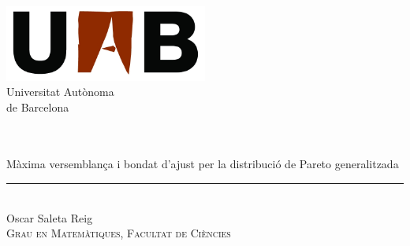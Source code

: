 
\begin{titlepage}

\begin{center}




\begin{minipage}[t]{0.4\textwidth}
\begin{center}
\includegraphics[width=0.5\textwidth]{figures/uab_logo.jpg}\\[0.15cm]
{\Large Universitat Autònoma \\de Barcelona}
\end{center}
\end{minipage}
\\[1.2cm]



\HRule\\[0.4cm]
{
\Huge Màxima versemblança i bondat d'ajust
per la distribució de Pareto generalitzada}\\[0.13cm]
\rule{\textwidth}{0.4pt}\vspace*{-\baselineskip}\vspace{3.2pt}
\HRule\\[0.7cm]
{\large Oscar Saleta Reig}\\[0.6cm]
\textsc{Grau en Matemàtiques, Facultat de Ciències}\\[0.6cm]



\end{center}
\end{titlepage}
